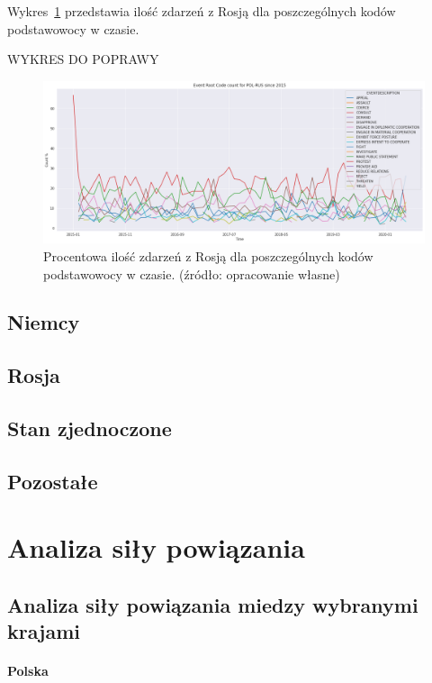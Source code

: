 \documentclass[11pt]{report}
\begin{document}
    Wykres~\ref{fig:PLRUSERC} przedstawia ilość zdarzeń z Rosją dla poszczególnych kodów podstawowocy w czasie.

    WYKRES DO POPRAWY
    \begin{figure}[ht!]
        \centering
        \includegraphics[width=1 \textwidth]{fig/PL/POLRUSERCperc.png}
        \caption{Procentowa ilość zdarzeń z Rosją dla poszczególnych kodów podstawowocy w czasie. (źródło: opracowanie własne)}
        \label{fig:PLRUSERC}
    \end{figure}

    \subsection{Niemcy}

    \subsection{Rosja}

    \subsection{Stan zjednoczone}

    \subsection{Pozostałe}


    \section{Analiza siły powiązania}

    \subsection{Analiza siły powiązania miedzy wybranymi krajami}

    \paragraph{Polska}
\end{document}

